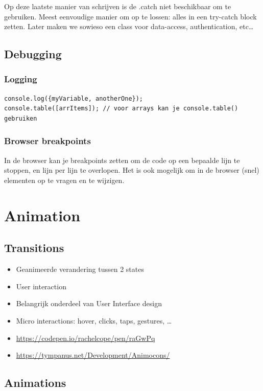 \documentclass{article}
\begin{document}
Op deze laatste manier van schrijven is de .catch niet beschikbaar om te gebruiken.
Meest eenvoudige manier om op te lossen: alles in een try-catch block zetten.
Later maken we sowieso een class voor data-access, authentication, etc\dots


\subsection{Debugging}

\subsubsection{Logging}
\begin{verbatim}
console.log({myVariable, anotherOne});
console.table([arrItems]); // voor arrays kan je console.table() gebruiken
\end{verbatim}

\subsubsection{Browser breakpoints}

In de browser kan je breakpoints zetten om de code op een bepaalde lijn te stoppen, en lijn per lijn te overlopen.
Het is ook mogelijk om in de browser (snel) elementen op te vragen en te wijzigen.


\section{Animation}

\subsection{Transitions}

\begin{itemize}
    \item Geanimeerde verandering tussen 2 states
    \item User interaction
    \item Belangrijk onderdeel van User Interface design
    \item Micro interactions: hover, clicks, taps, gestures, \dots
    \item \url{https://codepen.io/rachelcope/pen/raGwPq}
    \item \url{https://tympanus.net/Development/Animocons/}
\end{itemize}

\subsection{Animations}
\end{document}
